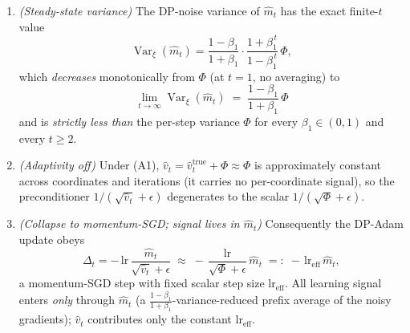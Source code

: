 \begin{theorem}
\begin{enumerate}
\item[\textbf{(ii)}] \emph{(Steady-state variance)} The DP-noise variance of $\hat m_t$ has the
exact finite-$t$ value
\begin{equation*}
  \operatorname{Var}_{\xi}(\hat m_t)
  =\frac{1-\beta_1}{1+\beta_1}\cdot\frac{1+\beta_1^{\,t}}{1-\beta_1^{\,t}}\,\Phi,
\end{equation*}
which \emph{decreases} monotonically from $\Phi$ (at $t=1$, no averaging) to
\begin{equation*}
  \boxed{\;\lim_{t\to\infty}\operatorname{Var}_{\xi}(\hat m_t)\;=\;\frac{1-\beta_1}{1+\beta_1}\,\Phi\;}
\end{equation*}
and is \emph{strictly less than} the per-step variance $\Phi$ for every $\beta_1\in(0,1)$ and every
$t\ge 2$.

\item[\textbf{(iii)}] \emph{(Adaptivity off)} Under (A1), $\hat v_t=\hat v_t^{\mathrm{true}}+\Phi
\approx\Phi$ is approximately constant across coordinates and iterations (it carries no
per-coordinate signal), so the preconditioner $1/(\sqrt{\hat v_t}+\epsilon)$ degenerates to the
scalar $1/(\sqrt\Phi+\epsilon)$.

\item[\textbf{(iv)}] \emph{(Collapse to momentum-SGD; signal lives in $\hat m_t$)} Consequently the
DP-Adam update obeys
\begin{equation*}
  \Delta_t=-\,\mathrm{lr}\,\frac{\hat m_t}{\sqrt{\hat v_t}+\epsilon}
  \;\approx\; -\,\frac{\mathrm{lr}}{\sqrt\Phi+\epsilon}\,\hat m_t
  \;=:\;-\,\mathrm{lr}_{\mathrm{eff}}\,\hat m_t,
\end{equation*}
a momentum-SGD step with fixed scalar step size $\mathrm{lr}_{\mathrm{eff}}$. All learning signal
enters \emph{only} through $\hat m_t$ (a $\tfrac{1-\beta_1}{1+\beta_1}$-variance-reduced prefix
average of the noisy gradients); $\hat v_t$ contributes only the constant $\mathrm{lr}_{\mathrm{eff}}$.
\end{enumerate}
\end{theorem}

